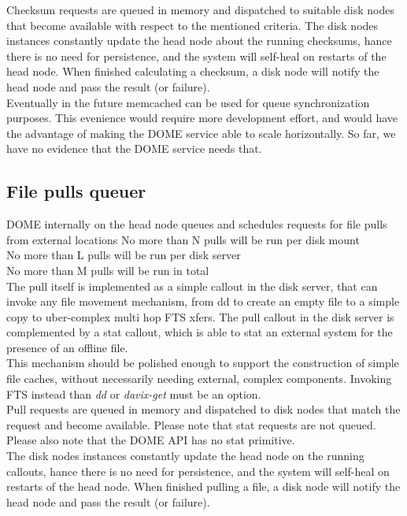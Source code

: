 \documentclass[a4paper,10pt]{scrreprt}
\begin{document}
 Checksum requests are queued in memory and dispatched to suitable disk nodes that become available with respect to the mentioned criteria. The disk nodes instances constantly update the head node about the running checksums, hance there is no need for persistence,
 and the system will self-heal on restarts of the head node. When finished calculating a checksum, a disk node will notify the head node and pass the result (or failure).\\
 Eventually in the future memcached can be used for queue synchronization purposes. This evenience would require more development effort, and would have the
 advantage of making the DOME service able to scale horizontally. So far, we have no evidence that the DOME service needs that.\\

\subsection{File pulls queuer}
DOME internally on the head node queues and schedules requests for file pulls from external locations
 No more than N pulls will be run per disk mount\\
 No more than L pulls will be run per disk server\\
 No more than M pulls will be run in total\\

The pull itself is implemented as a simple callout in the disk server, that can invoke any file movement mechanism, from
dd to create an empty file to a simple copy to uber-complex multi hop FTS xfers.
The pull callout in the disk server is complemented by a stat callout, which is able to stat an external system for the presence of an offline file.\\
This mechanism should be polished enough to support the construction of simple file caches,
without necessarily needing external, complex components. Invoking FTS instead than \textit{dd} or \textit{davix-get} must be an option.\\


Pull requests are queued in memory and dispatched to disk nodes that match the request and become available. Please note that stat requests are not queued. Please also note that the DOME API has no stat primitive.\\
The disk nodes instances constantly update the head node on the running callouts, hance there is no need for persistence,
and the system will self-heal on restarts of the head node. When finished pulling a file, a disk node will notify the head node and pass the result (or failure).\\
\end{document}
